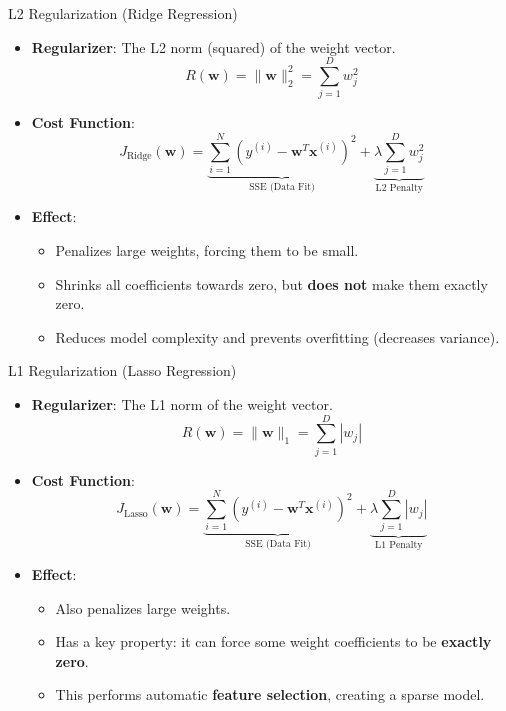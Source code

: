 \documentclass[serif, aspectratio=169]{beamer}
\begin{document}
\begin{frame}{L2 Regularization (Ridge Regression)}
    \begin{itemize}
        \item \textbf{Regularizer}: The L2 norm (squared) of the weight vector.
        \[
        R(\mathbf{w}) = \|\mathbf{w}\|_2^2 = \sum_{j=1}^{D} w_j^2
        \]
        \item \textbf{Cost Function}:
        \[
        J_{\text{Ridge}}(\mathbf{w}) = \underbrace{\sum_{i=1}^{N} \left( y^{(i)} - \mathbf{w}^T \mathbf{x}^{(i)} \right)^2}_{\text{SSE (Data Fit)}} + \underbrace{\lambda \sum_{j=1}^{D} w_j^2}_{\text{L2 Penalty}}
        \]
        \item \textbf{Effect}:
        \begin{itemize}
            \item Penalizes large weights, forcing them to be small.
            \item Shrinks all coefficients towards zero, but \textbf{does not} make them exactly zero.
            \item Reduces model complexity and prevents overfitting (decreases variance).
        \end{itemize}
    \end{itemize}
\end{frame}

\begin{frame}{L1 Regularization (Lasso Regression)}
    \begin{itemize}
        \item \textbf{Regularizer}: The L1 norm of the weight vector.
        \[
        R(\mathbf{w}) = \|\mathbf{w}\|_1 = \sum_{j=1}^{D} |w_j|
        \]
        \item \textbf{Cost Function}:
        \[
        J_{\text{Lasso}}(\mathbf{w}) = \underbrace{\sum_{i=1}^{N} \left( y^{(i)} - \mathbf{w}^T \mathbf{x}^{(i)} \right)^2}_{\text{SSE (Data Fit)}} + \underbrace{\lambda \sum_{j=1}^{D} |w_j|}_{\text{L1 Penalty}}
        \]
        \item \textbf{Effect}:
        \begin{itemize}
            \item Also penalizes large weights.
            \item Has a key property: it can force some weight coefficients to be \textbf{exactly zero}.
            \item This performs automatic \textbf{feature selection}, creating a sparse model.
        \end{itemize}
    \end{itemize}
\end{frame}
\end{document}
